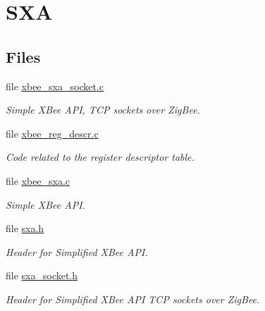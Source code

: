 \hypertarget{group___s_x_a}{}\section{S\+XA}
\label{group___s_x_a}
\subsection*{Files}
\begin{DoxyCompactItemize}
\item 
file \hyperlink{xbee__sxa__socket_8c}{xbee\+\_\+sxa\+\_\+socket.\+c}
\begin{DoxyCompactList}\small\item\em Simple X\+Bee A\+PI, T\+CP sockets over Zig\+Bee. \end{DoxyCompactList}\item 
file \hyperlink{xbee__reg__descr_8c}{xbee\+\_\+reg\+\_\+descr.\+c}
\begin{DoxyCompactList}\small\item\em Code related to the register descriptor table. \end{DoxyCompactList}\item 
file \hyperlink{xbee__sxa_8c}{xbee\+\_\+sxa.\+c}
\begin{DoxyCompactList}\small\item\em Simple X\+Bee A\+PI. \end{DoxyCompactList}\item 
file \hyperlink{sxa_8h}{sxa.\+h}
\begin{DoxyCompactList}\small\item\em Header for Simplified X\+Bee A\+PI. \end{DoxyCompactList}\item 
file \hyperlink{sxa__socket_8h}{sxa\+\_\+socket.\+h}
\begin{DoxyCompactList}\small\item\em Header for Simplified X\+Bee A\+PI T\+CP sockets over Zig\+Bee. \end{DoxyCompactList}\end{DoxyCompactItemize}
